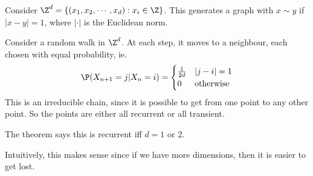 \documentclass[a4paper]{article}
\begin{document}
\begin{thm}
  Consider $\Z^d = \{(x_1, x_2, \cdots, x_d): x_i \in \Z\}$. This generates a graph with $x\sim y$ if $|x - y| = 1$, where $|\cdot |$ is the Euclidean norm.
  \begin{center}
  \end{center}
  Consider a random walk in $\Z^d$. At each step, it moves to a neighbour, each chosen with equal probability, ie.
   \[
    \P(X_{n + 1} = j| X_n = i) =
    \begin{cases}
      \frac{1}{2d} & |j - i| = 1\\
      0 & \text{otherwise}
    \end{cases}
  \]
  This is an irreducible chain, since it is possible to get from one point to any other point. So the points are either all recurrent or all transient.

  The theorem says this is recurrent iff $d = 1$ or $2$.
\end{thm}
Intuitively, this makes sense since if we have more dimensions, then it is easier to get lost.
\end{document}
